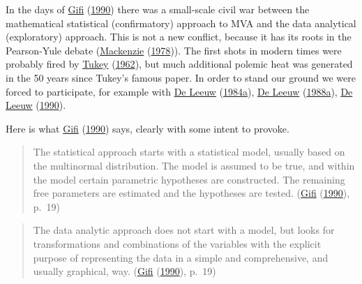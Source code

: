 \documentclass[
  12pt,
]{book}
\begin{document}
In the days of \protect\hyperlink{ref-gifi_B_90}{Gifi} (\protect\hyperlink{ref-gifi_B_90}{1990}) there was a small-scale civil war between the mathematical statistical (confirmatory) approach to MVA and the data analytical (exploratory) approach. This is not a new conflict, because it has its roots in the Pearson-Yule debate (\protect\hyperlink{ref-mackenzie_78}{Mackenzie} (\protect\hyperlink{ref-mackenzie_78}{1978})). The first shots in modern times were probably fired by \protect\hyperlink{ref-tukey_62}{Tukey} (\protect\hyperlink{ref-tukey_62}{1962}), but much additional polemic heat was generated in the 50 years since Tukey's famous paper. In order to stand our ground we were forced to participate, for example with \protect\hyperlink{ref-deleeuw_A_84c}{De Leeuw} (\protect\hyperlink{ref-deleeuw_A_84c}{1984a}), \protect\hyperlink{ref-deleeuw_A_88c}{De Leeuw} (\protect\hyperlink{ref-deleeuw_A_88c}{1988a}), \protect\hyperlink{ref-deleeuw_C_90b}{De Leeuw} (\protect\hyperlink{ref-deleeuw_C_90b}{1990}).

Here is what \protect\hyperlink{ref-gifi_B_90}{Gifi} (\protect\hyperlink{ref-gifi_B_90}{1990}) says, clearly with some intent to provoke.

\begin{quote}
The statistical approach starts with a statistical model, usually based on the
multinormal distribution. The model is assumed to be true, and within the model
certain parametric hypotheses are constructed. The remaining free parameters are
estimated and the hypotheses are tested. (\protect\hyperlink{ref-gifi_B_90}{Gifi} (\protect\hyperlink{ref-gifi_B_90}{1990}), p.~19)
\end{quote}

\begin{quote}
The data analytic approach does not start with a model, but looks for transformations
and combinations of the variables with the explicit purpose of representing the data
in a simple and comprehensive, and usually graphical, way. (\protect\hyperlink{ref-gifi_B_90}{Gifi} (\protect\hyperlink{ref-gifi_B_90}{1990}), p.~19)
\end{quote}
\end{document}
